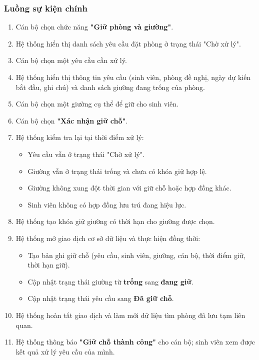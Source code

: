 \subsubsection{Luồng sự kiện chính}

\begin{enumerate}[leftmargin=1.6em]
\item Cán bộ chọn chức năng \textbf{"Giữ phòng và giường"}.
\item Hệ thống hiển thị danh sách yêu cầu đặt phòng ở trạng thái "Chờ xử lý".
\item Cán bộ chọn một yêu cầu cần xử lý.
\item Hệ thống hiển thị thông tin yêu cầu (sinh viên, phòng đề nghị, ngày dự kiến bắt đầu, ghi chú) và danh sách giường đang trống của phòng.
\item Cán bộ chọn một giường cụ thể để giữ cho sinh viên.
\item Cán bộ chọn \textbf{"Xác nhận giữ chỗ"}.
\item Hệ thống kiểm tra lại tại thời điểm xử lý:
\begin{itemize}
\item Yêu cầu vẫn ở trạng thái "Chờ xử lý".
\item Giường vẫn ở trạng thái trống và chưa có khóa giữ hợp lệ.
\item Giường không xung đột thời gian với giữ chỗ hoặc hợp đồng khác.
\item Sinh viên không có hợp đồng lưu trú đang hiệu lực.
\end{itemize}
\item Hệ thống tạo khóa giữ giường có thời hạn cho giường được chọn.
\item Hệ thống mở giao dịch cơ sở dữ liệu và thực hiện đồng thời:
\begin{itemize}
\item Tạo bản ghi giữ chỗ (yêu cầu, sinh viên, giường, cán bộ, thời điểm giữ, thời hạn giữ).
\item Cập nhật trạng thái giường từ \textbf{trống} sang \textbf{đang giữ}.
\item Cập nhật trạng thái yêu cầu sang \textbf{Đã giữ chỗ}.
\end{itemize}
\item Hệ thống hoàn tất giao dịch và làm mới dữ liệu tìm phòng đã lưu tạm liên quan.
\item Hệ thống thông báo \textbf{"Giữ chỗ thành công"} cho cán bộ; sinh viên xem được kết quả xử lý yêu cầu của mình.
\end{enumerate}

